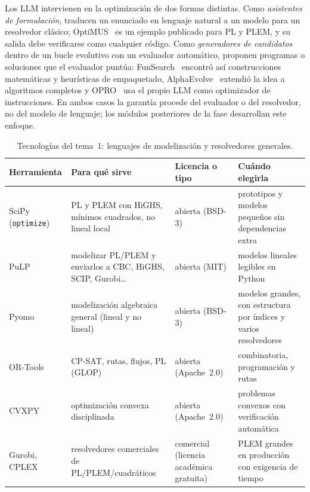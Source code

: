 \begin{observacion}\label{obs:llm}
Los LLM intervienen en la optimización de dos formas distintas. Como \emph{asistentes de formulación}, traducen un enunciado en lenguaje natural a un modelo para un resolvedor clásico; OptiMUS~\cite{optimus} es un ejemplo publicado para PL y PLEM, y su salida debe verificarse como cualquier código. Como \emph{generadores de candidatos} dentro de un bucle evolutivo con un evaluador automático, proponen programas o soluciones que el evaluador puntúa: FunSearch~\cite{funsearch} encontró así construcciones matemáticas y heurísticas de empaquetado, AlphaEvolve~\cite{alphaevolve} extendió la idea a algoritmos completos y OPRO~\cite{opro} usa el propio LLM como optimizador de instrucciones. En ambos casos la garantía procede del evaluador o del resolvedor, no del modelo de lenguaje; los módulos posteriores de la fase desarrollan este enfoque.
\end{observacion}

\begin{table}[h]
\centering\small
\caption{Tecnologías del tema~1: lenguajes de modelización y resolvedores generales.}\label{tab:tec1}
\begin{tabularx}{\textwidth}{@{}l>{\raggedright\arraybackslash}X>{\raggedright\arraybackslash}p{2.2cm}>{\raggedright\arraybackslash}X@{}}
\toprule
Herramienta & Para qué sirve & Licencia o tipo & Cuándo elegirla \\
\midrule
SciPy (\texttt{optimize}) & PL y PLEM con HiGHS, mínimos cuadrados, no lineal local & abierta (BSD-3) & prototipos y modelos pequeños sin dependencias extra \\
PuLP~\cite{pulp} & modelizar PL/PLEM y enviarlos a CBC, HiGHS, SCIP, Gurobi\dots & abierta (MIT) & modelos lineales legibles en Python \\
Pyomo & modelización algebraica general (lineal y no lineal) & abierta (BSD-3) & modelos grandes, con estructura por índices y varios resolvedores \\
OR-Tools~\cite{ortools-cpsat} & CP-SAT, rutas, flujos, PL (GLOP) & abierta (Apache~2.0) & combinatoria, programación y rutas \\
CVXPY~\cite{cvxpy} & optimización convexa disciplinada & abierta (Apache~2.0) & problemas convexos con verificación automática \\
Gurobi, CPLEX & resolvedores comerciales de PL/PLEM/cuadráticos & comercial (licencia académica gratuita) & PLEM grandes en producción con exigencia de tiempo \\
\bottomrule
\end{tabularx}
\end{table}

\addtocounter{definicion}{1}%

